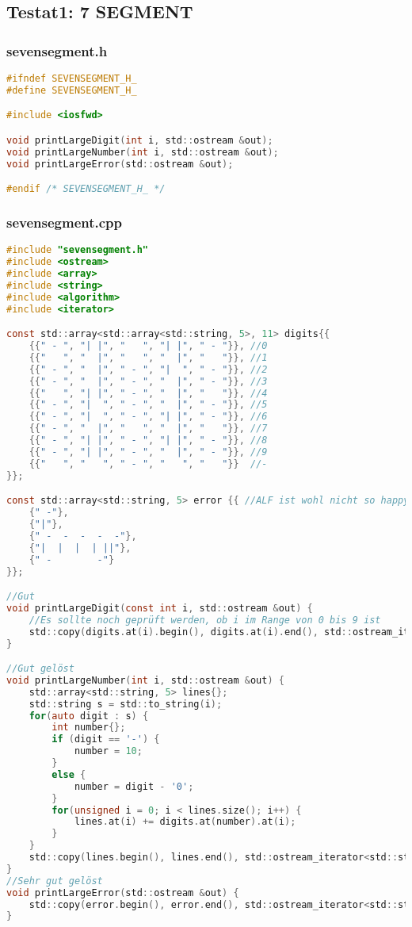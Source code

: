 
\subsection{Testat1: 7 SEGMENT}
\subsubsection{sevensegment.h}
\begin{lstlisting}[style=frame, style= linenumbers, language=C]
#ifndef SEVENSEGMENT_H_
#define SEVENSEGMENT_H_

#include <iosfwd>

void printLargeDigit(int i, std::ostream &out);
void printLargeNumber(int i, std::ostream &out);
void printLargeError(std::ostream &out);

#endif /* SEVENSEGMENT_H_ */
\end{lstlisting}

\subsubsection{sevensegment.cpp}
\begin{lstlisting}[style=frame, style= linenumbers, language=C]
#include "sevensegment.h"
#include <ostream>
#include <array>
#include <string>
#include <algorithm>
#include <iterator>

const std::array<std::array<std::string, 5>, 11> digits{{
	{{" - ", "| |", "   ", "| |", " - "}}, //0
	{{"   ", "  |", "   ", "  |", "   "}}, //1
	{{" - ", "  |", " - ", "|  ", " - "}}, //2
	{{" - ", "  |", " - ", "  |", " - "}}, //3
	{{"   ", "| |", " - ", "  |", "   "}}, //4
	{{" - ", "|  ", " - ", "  |", " - "}}, //5
	{{" - ", "|  ", " - ", "| |", " - "}}, //6
	{{" - ", "  |", "   ", "  |", "   "}}, //7
	{{" - ", "| |", " - ", "| |", " - "}}, //8
	{{" - ", "| |", " - ", "  |", " - "}}, //9
	{{"   ", "   ", " - ", "   ", "   "}}  //-
}};

const std::array<std::string, 5> error {{ //ALF ist wohl nicht so happy, da einiges an whitespace fehlt
	{" -"},
	{"|"},
	{" -  -  -  -  -"},
	{"|  |  |  | ||"},
	{" -        -"}
}};

//Gut
void printLargeDigit(const int i, std::ostream &out) {
	//Es sollte noch geprüft werden, ob i im Range von 0 bis 9 ist
	std::copy(digits.at(i).begin(), digits.at(i).end(), std::ostream_iterator<std::string>{out, "\n"});
}

//Gut gelöst
void printLargeNumber(int i, std::ostream &out) {
    std::array<std::string, 5> lines{};
    std::string s = std::to_string(i);
    for(auto digit : s) {
    	int number{};
    	if (digit == '-') {
    		number = 10;
    	}
    	else {
    		number = digit - '0';
    	}
        for(unsigned i = 0; i < lines.size(); i++) {
            lines.at(i) += digits.at(number).at(i);
        }
    }
    std::copy(lines.begin(), lines.end(), std::ostream_iterator<std::string>{out, "\n"});
}
//Sehr gut gelöst
void printLargeError(std::ostream &out) {
	std::copy(error.begin(), error.end(), std::ostream_iterator<std::string>{out, "\n"});
}
\end{lstlisting}

